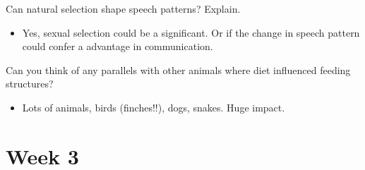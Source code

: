 \documentclass[12pt,a4paper]{article}
\begin{document}
\begin{enumerate}
    {\color{darklc}\item Can natural selection shape speech patterns? Explain.}
        \begin{itemize}
            \item Yes, sexual selection could be a significant. Or if the change in speech pattern could confer a advantage in communication.
        \end{itemize}
    {\color{darklc}\item Can you think of any parallels with other animals where diet influenced feeding structures?}
        \begin{itemize}
            \item Lots of animals, birds (finches!!), dogs, snakes. Huge impact.
        \end{itemize}
\end{enumerate}

\clearpage
\section*{Week 3}
{}

\end{document}
